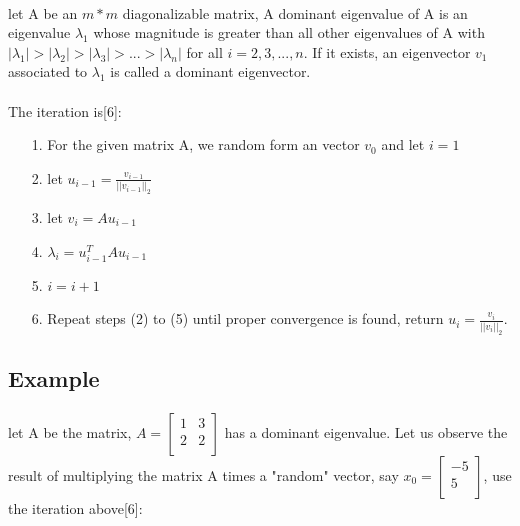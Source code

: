 \documentclass[12pt]{article}
\begin{document}
\paragraph{}let A be an $m * m$ diagonalizable matrix, A dominant eigenvalue of A is an eigenvalue $\lambda_1$ whose magnitude is greater than all other eigenvalues of A  with $|\lambda_1|>|\lambda_2|>|\lambda_3|>...>|\lambda_n|$ for all $i=2,3,...,n$. If it exists, an eigenvector $v_1$ associated to $\lambda_1$ is called a dominant eigenvector.

\paragraph{}The iteration is[6]:

\begin{itemize}
    \item[1.] For the given matrix A, we random form an vector $v_0$ and let $i = 1$
    \item[2.] let $u_{i-1} = \frac{v_{i-1}}{||v_{i-1}||_2}$
    \item[3.] let $v_i = Au_{i-1}$
    \item[4.] $\lambda_i = u_{i-1}^TAu_{i-1}$
    \item[5.] $i = i+1$
    \item[6.] Repeat steps (2) to (5) until proper convergence is found, return $u_i = \frac{v_i}{||v_i||_2}$.
\end{itemize}

\subsection{Example}

\paragraph{}let A be the matrix, $A = \begin{bmatrix}1 & 3 \\2 & 2 \\\end{bmatrix}$ has a dominant eigenvalue. Let us observe the result of multiplying the matrix A times a "random" vector, say $x_0 = \begin{bmatrix}-5 \\5 \\\end{bmatrix}$, use the iteration above[6]:\\
\end{document}
